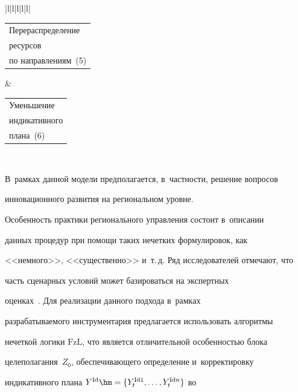 \begin{table}
\begin{center}
\begin{tabular}{|l|l|l|l|l|}


{\tabcolsep=0pt\begin{tabular}{l}Перераспределение\\ ресурсов\\ 


по направлениям~(5)\end{tabular}}&


\tabcolsep=0pt\begin{tabular}{l}Уменьшение\\ индикативного\\ плана~(6)\end{tabular}\\


\hline


\end{tabular}


\end{center}


\vspace*{-6pt}


\end{table}


  


  В~рамках данной модели предполагается, в~част\-ности, решение вопросов 


инновационного развития на региональном уровне.


  








  


  Особенность практики регионального управления со\-сто\-ит в~описании 


данных процедур при помощи таких нечетких формулировок, как 


<<немного>>, <<существенно>> и~т.\,д. Ряд исследователей отмечают, что 


часть сценарных условий может базироваться на экспертных  


оценках~\cite{4-or}. Для реализации данного подхода в~рамках 


разрабатываемого инструментария предлагается использовать алгоритмы 


нечеткой логики $\mathrm{FzL}$, что является отличительной особенностью блока 


целеполагания~$Z_0$, обес\-пе\-чи\-ва\-юще\-го определение и~корректировку 


индикативного плана $Y^{\mathrm{Id}}\hm= \{Y^{\mathrm{Id}1}_t, \ldots , Y_t^{\mathrm{Id}n}\}$ во 


